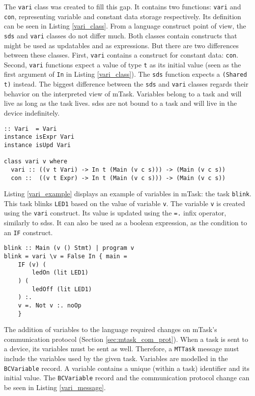 The \texttt{vari} class was created to fill this gap. It contains two functions: \texttt{vari} and \texttt{con}, representing variable and constant data storage respectively. Its definition can be seen in Listing \ref{vari_class}. From a language construct point of view, the \texttt{sds} and \texttt{vari} classes do not differ much. Both classes contain constructs that might be used as updatables and as expressions. But there are two differences between these classes. First, \texttt{vari} contains a construct for constant data: \texttt{con}. Second, \texttt{vari} functions expect a value of type \texttt{t} as its initial value (seen as the first argument of \texttt{In} in Listing \ref{vari_class}). The \texttt{sds} function expects a \texttt{(Shared t)} instead. The biggest difference between the \texttt{sds} and \texttt{vari} classes regards their behavior on the interpreted view of \gls{mTask}. Variables belong to a task and will live as long as the task lives. \acp{sds} are not bound to a task and will live in the device indefinitely. 


\begin{lstlisting}[caption=The \texttt{vari} class,captionpos=b,label=vari_class]
:: Vari  = Vari
instance isExpr Vari 
instance isUpd Vari 

class vari v where
  vari :: ((v t Vari) -> In t (Main (v c s))) -> (Main (v c s)) 
  con ::  ((v t Expr) -> In t (Main (v c s))) -> (Main (v c s))
\end{lstlisting}

Listing \ref{vari_example} displays an example of variables in \gls{mTask}: the task \texttt{blink}. This task blinks \texttt{LED1} based on the value of variable \texttt{v}. The variable \texttt{v} is created using the \texttt{vari} construct. Its value is updated using the \texttt{=.} infix operator, similarly to \acp{sds}. It can also be used as a boolean expression, as the condition to an \texttt{IF} construct.

\begin{lstlisting}[caption=Example of the usage of variables in mTask,captionpos=b,label=vari_example]
blink :: Main (v () Stmt) | program v
blink = vari \v = False In { main =
	IF (v) (
		ledOn (lit LED1)
	) (
		ledOff (lit LED1)
	) :.
	v =. Not v :. noOp
	}
\end{lstlisting}

The addition of variables to the language required changes on \gls{mTask}'s communication protocol (Section \ref{sec:mtask_com_prot}). When a task is sent to a device, its variables must be sent as well. Therefore, a \texttt{MTTask} message must include the variables used by the given task. Variables are modelled in the \texttt{BCVariable} record. A variable contains a unique (within a task) identifier and its initial value. The \texttt{BCVariable} record and the communication protocol change can be seen in Listing \ref{vari_message}.

